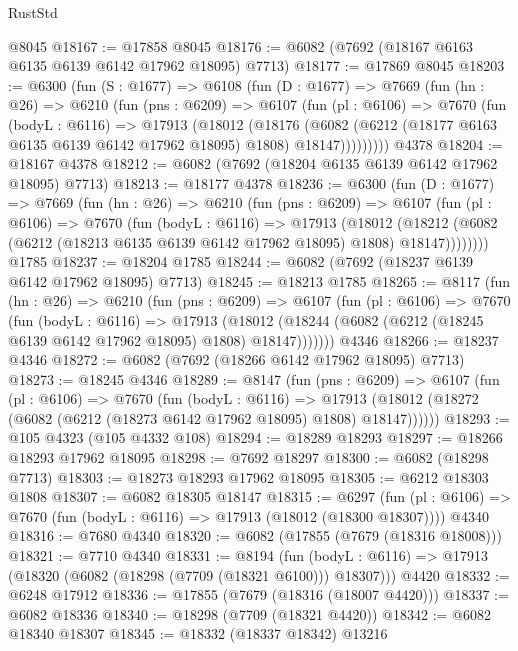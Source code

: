 \begin{lexlean}{RustStd}
\begin{coremodule}
    @8045
@18167 := @17858 @8045
@18176 := @6082 (@7692 (@18167 @6163 @6135 @6139 @6142 @17962 @18095) @7713)
@18177 := @17869 @8045
@18203 := @6300
    (fun (S : @1677) =>
    @6108
      (fun (D : @1677) =>
      @7669
        (fun (hn : @26) =>
        @6210
          (fun (pns : @6209) =>
          @6107
            (fun (pl : @6106) =>
            @7670
              (fun (bodyL : @6116) =>
              @17913
                (@18012
                  (@18176
                    (@6082
                      (@6212 (@18177 @6163 @6135 @6139 @6142 @17962 @18095) @1808)
                      @18147)))))))))
    @4378
@18204 := @18167 @4378
@18212 := @6082 (@7692 (@18204 @6135 @6139 @6142 @17962 @18095) @7713)
@18213 := @18177 @4378
@18236 := @6300
    (fun (D : @1677) =>
    @7669
      (fun (hn : @26) =>
      @6210
        (fun (pns : @6209) =>
        @6107
          (fun (pl : @6106) =>
          @7670
            (fun (bodyL : @6116) =>
            @17913
              (@18012
                (@18212 (@6082 (@6212 (@18213 @6135 @6139 @6142 @17962 @18095) @1808) @18147))))))))
    @1785
@18237 := @18204 @1785
@18244 := @6082 (@7692 (@18237 @6139 @6142 @17962 @18095) @7713)
@18245 := @18213 @1785
@18265 := @8117
    (fun (hn : @26) =>
    @6210
      (fun (pns : @6209) =>
      @6107
        (fun (pl : @6106) =>
        @7670
          (fun (bodyL : @6116) =>
          @17913
            (@18012 (@18244 (@6082 (@6212 (@18245 @6139 @6142 @17962 @18095) @1808) @18147)))))))
    @4346
@18266 := @18237 @4346
@18272 := @6082 (@7692 (@18266 @6142 @17962 @18095) @7713)
@18273 := @18245 @4346
@18289 := @8147
    (fun (pns : @6209) =>
    @6107
      (fun (pl : @6106) =>
      @7670
        (fun (bodyL : @6116) =>
        @17913 (@18012 (@18272 (@6082 (@6212 (@18273 @6142 @17962 @18095) @1808) @18147))))))
@18293 := @105 @4323 (@105 @4332 @108)
@18294 := @18289 @18293
@18297 := @18266 @18293 @17962 @18095
@18298 := @7692 @18297
@18300 := @6082 (@18298 @7713)
@18303 := @18273 @18293 @17962 @18095
@18305 := @6212 @18303 @1808
@18307 := @6082 @18305 @18147
@18315 := @6297
    (fun (pl : @6106) => @7670 (fun (bodyL : @6116) => @17913 (@18012 (@18300 @18307))))
    @4340
@18316 := @7680 @4340
@18320 := @6082 (@17855 (@7679 (@18316 @18008)))
@18321 := @7710 @4340
@18331 := @8194
    (fun (bodyL : @6116) => @17913 (@18320 (@6082 (@18298 (@7709 (@18321 @6100))) @18307)))
    @4420
@18332 := @6248 @17912
@18336 := @17855 (@7679 (@18316 (@18007 @4420)))
@18337 := @6082 @18336
@18340 := @18298 (@7709 (@18321 @4420))
@18342 := @6082 @18340 @18307
@18345 := @18332 (@18337 @18342) @13216

\end{coremodule}
\end{lexlean}
